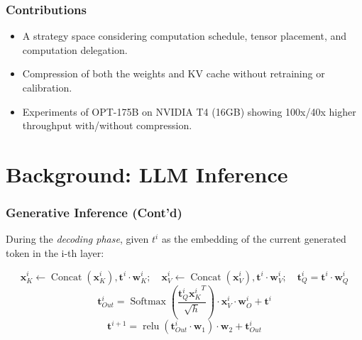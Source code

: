 \documentclass[12pt,aspectratio=169]{beamer}
\begin{document}
    \begin{frame}
        \frametitle{Contributions}

        \begin{itemize}
            \setlength{\itemsep}{.8em}
            \item A strategy space considering computation schedule, tensor placement, and computation delegation.
            \item Compression of both the weights and KV cache without retraining or calibration.
            \item Experiments of OPT-175B on NVIDIA T4 (16GB) showing 100x/40x higher throughput with/without compression.
        \end{itemize}
    \end{frame}



    \section{Background: LLM Inference}


    \begin{frame}
        \frametitle{Generative Inference (Cont'd)}

        During the \textit{decoding phase}, given $t^i$ as the embedding of the current generated token in the i-th
        layer:

        $$ \mathbf{x}_K^i \leftarrow \operatorname{Concat}(\mathbf{x}_K^i), \mathbf{t}^i \cdot \mathbf{w}_K^i;\quad \mathbf{x}_V^i \leftarrow \operatorname{Concat}(\mathbf{x}_V^i), \mathbf{t}^i \cdot \mathbf{w}_V^i;\quad \mathbf{t}_Q^i = \mathbf{t}^i \cdot \mathbf{w}_Q^i $$
        $$ \mathbf{t}_{Out}^i = \operatorname{Softmax}(\frac{\mathbf{t}_Q^i{\mathbf{x}_K^i}^T}{\sqrt{h}}) \cdot \mathbf{x}_V^i \cdot \mathbf{w}_O^i + \mathbf{t}^i $$
        $$ \mathbf{t}^{i+1} = \operatorname{relu}(\mathbf{t}_{Out}^i \cdot \mathbf{w}_1) \cdot \mathbf{w}_2 + \mathbf{t}_{Out}^i $$
    \end{frame}
\end{document}
